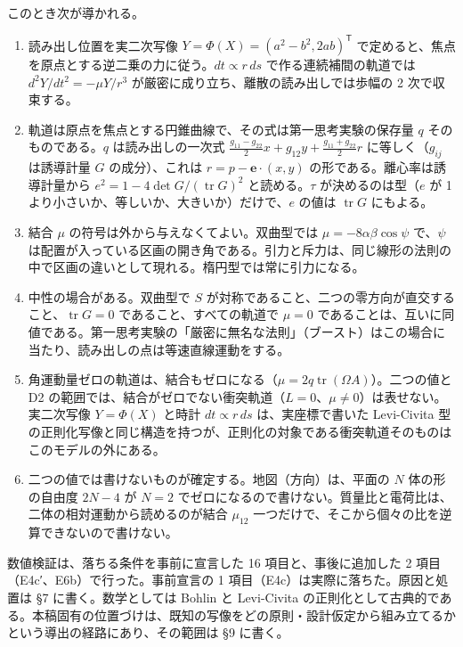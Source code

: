\documentclass[
  a4paper,
]{ltjsarticle}
\providecommand{\tightlist}{%
  \setlength{\itemsep}{0pt}\setlength{\parskip}{0pt}}
\begin{document}
このとき次が導かれる。

\begin{enumerate}
\def\labelenumi{\arabic{enumi}.}
\tightlist
\item
  読み出し位置を実二次写像 \(Y=\Phi(X)=(a^2-b^2,2ab)^{\mathsf T}\)
  で定めると、焦点を原点とする逆二乗の力に従う。\(dt\propto r\,ds\)
  で作る連続補間の軌道では \(d^2Y/dt^2=-\mu Y/r^3\)
  が厳密に成り立ち、離散の読み出しでは歩幅の 2 次で収束する。
\item
  軌道は原点を焦点とする円錐曲線で、その式は第一思考実験の保存量 \(q\)
  そのものである。\(q\) は読み出しの一次式
  \(\frac{g_{11}-g_{22}}{2}x+g_{12}y+\frac{g_{11}+g_{22}}{2}r\)
  に等しく（\(g_{ij}\) は誘導計量 \(G\) の成分）、これは
  \(r=p-\mathbf e\cdot(x,y)\) の形である。離心率は誘導計量から
  \(e^2=1-4\det G/(\operatorname{tr}G)^2\) と読める。\(\tau\)
  が決めるのは型（\(e\) が 1
  より小さいか、等しいか、大きいか）だけで、\(e\) の値は
  \(\operatorname{tr}G\) にもよる。
\item
  結合 \(\mu\) の符号は外から与えなくてよい。双曲型では
  \(\mu=-8\alpha\beta\cos\psi\) で、\(\psi\)
  は配置が入っている区画の開き角である。引力と斥力は、同じ線形の法則の中で区画の違いとして現れる。楕円型では常に引力になる。
\item
  中性の場合がある。双曲型で \(S\)
  が対称であること、二つの零方向が直交すること、\(\operatorname{tr}G=0\)
  であること、すべての軌道で \(\mu=0\)
  であることは、互いに同値である。第一思考実験の「厳密に無名な法則」（ブースト）はこの場合に当たり、読み出しの点は等速直線運動をする。
\item
  角運動量ゼロの軌道は、結合もゼロになる（\(\mu=2q\operatorname{tr}(\Omega A)\)）。二つの値と
  D2
  の範囲では、結合がゼロでない衝突軌道（\(L=0\)、\(\mu\neq0\)）は表せない。実二次写像
  \(Y=\Phi(X)\) と時計 \(dt\propto r\,ds\) は、実座標で書いた
  Levi-Civita
  型の正則化写像と同じ構造を持つが、正則化の対象である衝突軌道そのものはこのモデルの外にある。
\item
  二つの値では書けないものが確定する。地図（方向）は、平面の \(N\)
  体の形の自由度 \(2N-4\) が \(N=2\)
  でゼロになるので書けない。質量比と電荷比は、二体の相対運動から読めるのが結合
  \(\mu_{12}\) 一つだけで、そこから個々の比を逆算できないので書けない。
\end{enumerate}

数値検証は、落ちる条件を事前に宣言した 16 項目と、事後に追加した 2
項目（E4c′、E6b）で行った。事前宣言の 1
項目（E4c）は実際に落ちた。原因と処置は §7 に書く。数学としては Bohlin
と Levi-Civita
の正則化として古典的である。本稿固有の位置づけは、既知の写像をどの原則・設計仮定から組み立てるかという導出の経路にあり、その範囲は
§9 に書く。
\end{document}
